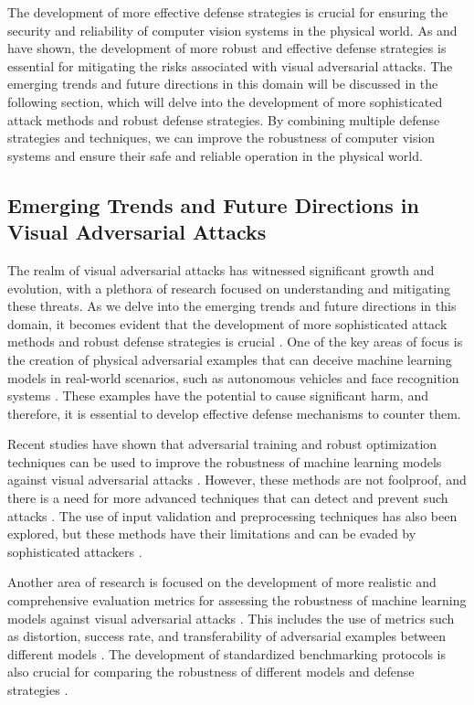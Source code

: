 \documentclass[11pt,a4paper]{article}
\begin{document}
The development of more effective defense strategies is crucial for ensuring the security and reliability of computer vision systems in the physical world. As \cite{doi:10.1109/iros51168.2021.9636638} and \cite{doi:10.1109/access.2020.2993304} have shown, the development of more robust and effective defense strategies is essential for mitigating the risks associated with visual adversarial attacks. The emerging trends and future directions in this domain will be discussed in the following section, which will delve into the development of more sophisticated attack methods and robust defense strategies. By combining multiple defense strategies and techniques, we can improve the robustness of computer vision systems and ensure their safe and reliable operation in the physical world.


\subsection{Emerging Trends and Future Directions in Visual Adversarial Attacks}


The realm of visual adversarial attacks has witnessed significant growth and evolution, with a plethora of research focused on understanding and mitigating these threats. As we delve into the emerging trends and future directions in this domain, it becomes evident that the development of more sophisticated attack methods and robust defense strategies is crucial \cite{doi:10.1145/3128572.3140444}. One of the key areas of focus is the creation of physical adversarial examples that can deceive machine learning models in real-world scenarios, such as autonomous vehicles and face recognition systems \cite{arxiv:1707.07397}. These examples have the potential to cause significant harm, and therefore, it is essential to develop effective defense mechanisms to counter them.

Recent studies have shown that adversarial training and robust optimization techniques can be used to improve the robustness of machine learning models against visual adversarial attacks \cite{arxiv:1705.07204}. However, these methods are not foolproof, and there is a need for more advanced techniques that can detect and prevent such attacks \cite{arxiv:1902.06705}. The use of input validation and preprocessing techniques has also been explored, but these methods have their limitations and can be evaded by sophisticated attackers \cite{doi:10.1109/tnnls.2021.3105238}.

Another area of research is focused on the development of more realistic and comprehensive evaluation metrics for assessing the robustness of machine learning models against visual adversarial attacks \cite{doi:10.1007/978-3-030-01258-8_39}. This includes the use of metrics such as distortion, success rate, and transferability of adversarial examples between different models \cite{doi:10.1145/3274895.3274904}. The development of standardized benchmarking protocols is also crucial for comparing the robustness of different models and defense strategies \cite{doi:10.1109/tgrs.2022.3225306}.
\end{document}
